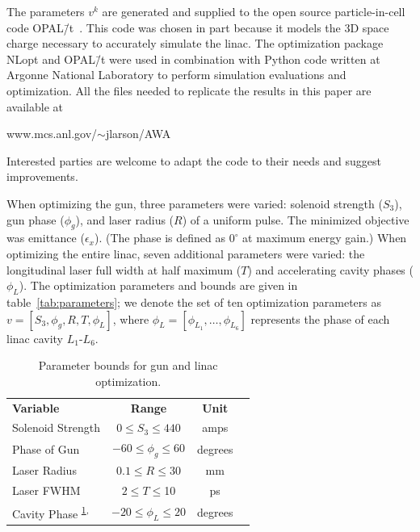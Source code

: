 \documentclass{iitthesis}
\begin{document}
The parameters $v^k$ are generated and supplied to the open source particle-in-cell code OPAL\=/t~\cite{opal}. 
This code was chosen in part because it models the 3D space charge necessary to accurately simulate the linac.
The optimization package NLopt and OPAL\=/t were used
in combination with Python code written at Argonne National Laboratory to perform simulation evaluations and optimization.
All the files needed to replicate the results in this paper are available at
\begin{center}
	www.mcs.anl.gov/$\sim$jlarson/AWA
\end{center}
Interested parties are welcome to adapt the code to their needs
and suggest improvements.

When optimizing the gun, three parameters were varied: solenoid strength ($S_3$), gun phase
($\phi_g$), and laser radius ($R$) of a uniform pulse. The minimized objective was emittance ($\epsilon_x$).
(The phase is defined as $0^{\circ}$ at maximum energy gain.) 
When optimizing the entire linac, seven additional parameters were 
varied: the longitudinal laser full width at half maximum ($T$)
and accelerating cavity phases ($\phi_L$). The optimization parameters and
bounds are given in table~\ref{tab:parameters}; we denote the set of
ten optimization parameters as $v=[S_3, \phi_g, R, T, \phi_L]$, where 
$\phi_L=[\phi_{L_1},\ldots,\phi_{L_6}]$ represents the phase of each linac cavity $L_1$-$L_6$. 
\vspace*{-\baselineskip}
\begin{table}[h] %
	\caption{\label{tab:parameters} Parameter bounds for gun and linac optimization.}
	\begin{center}
		\begin{tabular}{ l *{3}{c}}
			\textbf{Variable} & \textbf{Range} & \textbf{Unit} \\
			Solenoid Strength & $ 0 \le S_3 \le 440$  & amps \\
			Phase of Gun & $-60 \le \phi_g \le 60$  & degrees \\
			Laser Radius  & $0.1 \le R \le 30$  & mm \\
			Laser FWHM \footnotemark \label{note1}& $2 \le T \le $10  & ps \\
			Cavity Phase \textsuperscript{\ref{note1},}\footnotemark & $-20 \le \phi_L \le 20$  & degrees \\
		\end{tabular}
	\end{center}
\end{table}
\addtocounter{footnote}{-1}
\addtocounter{footnote}{+1}
\end{document}

